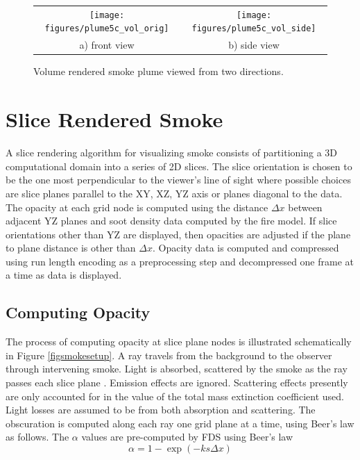 \begin{figure}[\figoptions]
\begin{center}
\begin{tabular}{cc}
\texttt{[image: figures/plume5c\_vol\_orig]}&
\texttt{[image: figures/plume5c\_vol\_side]}\\
a) front view&b) side view\\
\end{tabular}
\end{center}
\caption {Volume rendered smoke plume viewed from two directions.}
\label{volplume_example}
\end{figure}

%
%

\section{Slice Rendered Smoke}
A slice rendering algorithm for visualizing smoke consists of
partitioning a 3D computational domain into a series of 2D slices.
The slice orientation is chosen to be the one most perpendicular to the viewer's line
of sight where possible choices are slice planes parallel to the XY, XZ, YZ axis or planes diagonal to the data.  The opacity at each grid node is computed using the distance $\Delta x$ between adjacent YZ planes and soot density data computed by the fire model.  If slice orientations other than YZ are displayed, then opacities are adjusted if the plane to plane distance is other than $\Delta x$.  Opacity data is computed and compressed using run length encoding as a preprocessing step and decompressed one frame at a time as data is displayed.


%
%

\subsection{Computing Opacity}
The process of computing opacity at slice plane nodes is
illustrated schematically in Figure \ref{figsmokesetup}. A ray
travels from the background to the observer through intervening
smoke. Light is absorbed,
scattered by the smoke as the ray passes each slice plane .  Emission effects are ignored.
Scattering effects presently are only accounted for in the value
of the total mass extinction coefficient used.  Light losses are
assumed to be from both absorption and scattering. The obscuration
is computed along each ray one grid plane at a time, using Beer's
law as follows.  The $\alpha$ values are pre-computed by FDS using
Beer's law~\cite{Siegel:2001}
\begin{equation}
\alpha=1-\exp(-ks\Delta x) \label{eq:alpha}
\end{equation}

